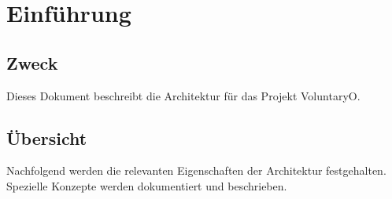 \chapter{Einführung}
	\section{Zweck}
	Dieses Dokument beschreibt die Architektur für das Projekt VoluntaryO.
	
	
	\section{Übersicht}
	Nachfolgend werden die relevanten Eigenschaften der Architektur festgehalten. Spezielle Konzepte werden dokumentiert und beschrieben.